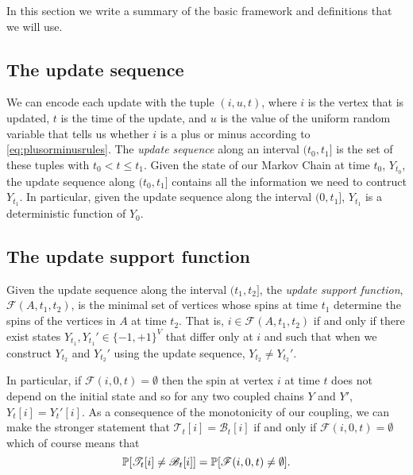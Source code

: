 	In this section we write a summary of the basic framework and definitions that we will use.

	\subsection{The update sequence}
	We can encode each update with the tuple $(i, u, t)$, where $i$ is the	vertex that is updated, $t$ is the time of the update, and $u$ is the value of the uniform random variable that tells us whether $i$ is a plus or minus	according to \eqref{eq:plusorminusrules}. The \emph{update sequence} along 	an interval $(t_0, t_1]$ is the set of these tuples with $t_0 < t \leq t_1$. Given the state of our Markov Chain at time $t_0$, $Y_{t_0}$, the update sequence along $(t_0, t_1]$ contains all the information we need to contruct $Y_{t_1}$. In particular, given the update sequence along the interval $(0, t_1]$, $Y_{t_1}$ is a deterministic function of $Y_0$.

	\subsection{The update support function}
	\label{sec: definition update support function}
	Given the update sequence along the interval $(t_1, t_2]$, the \emph{update support function}, $\mathscr{F}(A, t_1, t_2)$, is the minimal set of vertices whose spins at time $t_1$ determine the spins of the vertices in $A$ at time $t_2$. That is, $i \in \mathscr{F}(A, t_1, t_2)$ if and only if there exist states $Y_{t_1}, Y_{t_1}' \in \{-1, +1\}^{V}$ that differ only at $i$ and such that when we construct $Y_{t_2}$ and $Y_{t_2}'$ using the update sequence, $Y_{t_2} \neq Y_{t_2}'$.

	In particular, if $\mathscr{F}(i, 0, t) = \emptyset$ then the spin at vertex $i$ at time $t$ does not depend on the initial state and so for any two coupled chains $Y$ and $Y'$, $Y_t[i] = Y_t'[i]$. 
	As a consequence of the monotonicity of our coupling, we can make the stronger statement that $\mathscr{T}_t[i] = \mathscr{B}_t[i]$ if and only if $\mathscr{F}(i, 0, t) = \emptyset$ which of course means that
	\begin{equation}
	\label{eq:prob equality of coupling and empty support}
		\mathbb{P}[\mathscr{T}_t[i] \neq \mathscr{B}_t[i]] = \mathbb{P}[\mathscr{F}(i, 0, t) \neq \emptyset].
	\end{equation}

